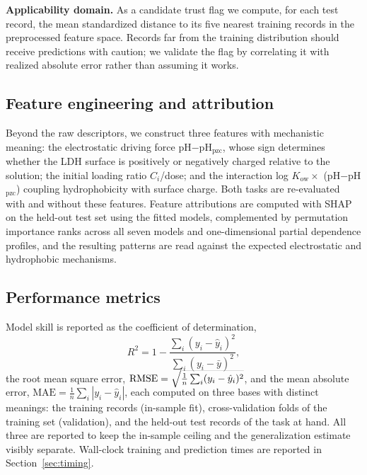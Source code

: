 \textbf{Applicability domain.} As a candidate trust flag we compute, for
each test record, the mean standardized distance to its five nearest
training records in the preprocessed feature space. Records far from the
training distribution should receive predictions with caution; we
validate the flag by correlating it with realized absolute error rather
than assuming it works.

\subsection{Feature engineering and attribution}
\label{sec:features}

Beyond the raw descriptors, we construct three features with mechanistic
meaning: the electrostatic driving force pH$-$pH$_{\mathrm{pzc}}$, whose
sign determines whether the LDH surface is positively or negatively
charged relative to the solution; the initial loading ratio $C_i$/dose;
and the interaction log $K_{\mathrm{ow}} \times$
(pH$-$pH$_{\mathrm{pzc}}$) coupling hydrophobicity with surface charge.
Both tasks are re-evaluated with and without these features. Feature
attributions are computed with SHAP \citep{lundberg2017shap} on the
held-out test set using the fitted models, complemented by permutation
importance ranks across all seven models and one-dimensional partial
dependence profiles, and the resulting patterns are read against the
expected electrostatic and hydrophobic mechanisms.

\subsection{Performance metrics}
\label{sec:metrics}

Model skill is reported as the coefficient of determination,
\begin{equation}
R^2 = 1 - \frac{\sum_i (y_i - \hat{y}_i)^2}{\sum_i (y_i - \bar{y})^2},
\label{eq:r2}
\end{equation}
the root mean square error,
$\mathrm{RMSE} = \smash{\sqrt{\tfrac{1}{n}\sum_i (y_i - \hat{y}_i)^2}}$,
and the mean absolute error,
$\mathrm{MAE} = \tfrac{1}{n}\sum_i |y_i - \hat{y}_i|$,
each computed on three bases with distinct meanings: the training
records (in-sample fit), cross-validation folds of the training set
(validation), and the held-out test records of the task at hand. All
three are reported to keep the in-sample ceiling and the generalization
estimate visibly separate. Wall-clock training and prediction times are
reported in Section~\ref{sec:timing}.

